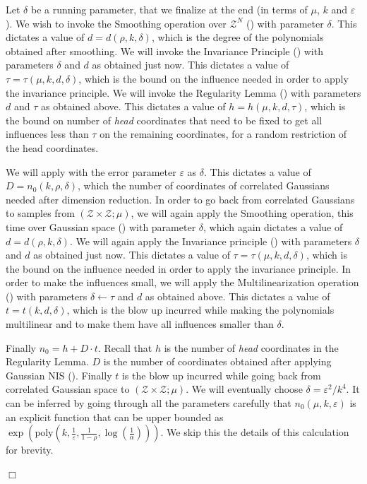 \documentclass[11pt]{article}
\newcommand{\inparen}[1]{\left ( #1 \right )}
\newcommand{\eps}{\varepsilon}
\newcommand{\calZ}{\mathcal{Z}}
\newcommand{\poly}{\mathrm{poly}}
\newenvironment{proofof}[1]{\noindent {\em Proof of #1.} \hspace*{1mm}}{\hfill $\Box$}
\begin{document}
\begin{proofof}{\Cref{thm:non-int-sim}}
Let $\delta$ be a running parameter, that we finalize at the end (in terms of $\mu$, $k$ and $\eps$). We wish to invoke the Smoothing operation over $\calZ^N$ () with parameter $\delta$. This dictates a value of $d = d(\rho, k, \delta)$, which is the degree of the polynomials obtained after smoothing. We will invoke the Invariance Principle () with parameters $\delta$ and $d$ as obtained just now. This dictates a value of $\tau = \tau(\mu, k, d, \delta)$, which is the bound on the influence needed in order to apply the invariance principle. We will invoke the Regularity Lemma () with parameters $d$ and $\tau$ as obtained above. This dictates a value of $h = h(\mu,k,d,\tau)$, which is the bound on number of {\em head} coordinates that need to be fixed to get all influences less than $\tau$ on the remaining coordinates, for a random restriction of the head coordinates.

We will apply  with the error parameter $\eps$ as $\delta$. This dictates a value of $D = n_0(k,\rho,\delta)$, which the number of coordinates of correlated Gaussians needed after dimension reduction. In order to go back from correlated Gaussians to samples from $(\calZ \times \calZ; \mu)$, we will again apply the Smoothing operation, this time over Gaussian space () with parameter $\delta$, which again dictates a value of $d = d(\rho, k, \delta)$. We will again apply the Invariance principle () with parameters $\delta$ and $d$ as obtained just now. This dictates a value of $\tau = \tau(\mu, k, d, \delta)$, which is the bound on the influence needed in order to apply the invariance principle. In order to make the influences small, we will apply the Multilinearization operation () with parameters $\delta \gets \tau$ and $d$ as obtained above. This dictates a value of $t = t(k,d,\delta)$, which is the blow up incurred while making the polynomials multilinear and to make them have all influences smaller than $\delta$.

Finally $n_0 = h + D \cdot t$. Recall that $h$ is the number of {\em head} coordinates in the Regularity Lemma. $D$ is the number of coordinates obtained after applying Gaussian NIS (). Finally $t$ is the blow up incurred while going back from correlated Gaussian space to $(\calZ \times \calZ; \mu)$. We will eventually choose $\delta = \eps^2/k^4$. It can be inferred by going through all the parameters carefully that $n_0(\mu, k, \eps)$ is an explicit function that can be upper bounded as $\exp \inparen{\poly \inparen{k, \frac{1}{\eps}, \frac{1}{1-\rho}, \log \inparen{\frac{1}{\alpha}}}}$. We skip this the details of this calculation for brevity.


\end{proofof}
\end{document}

